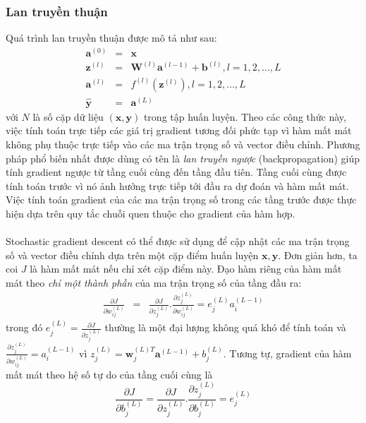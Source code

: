 \documentclass{article}
\begin{document}
\subsubsection*{Lan truyền thuận}
Quá trình lan truyền thuận được mô tả như sau:
\begin{eqnarray}
\label{eq41}
    \textbf{a}^{(0)} &=& \textbf{x}\\
    \label{eq42}
    \textbf{z}^{(l)} &=& \textbf{W}^{(l)}\textbf{a}^{(l-1)}+\textbf{b}^{(l)}, l=1,2,\ldots,L\\
    \label{eq43}
    \textbf{a}^{(l)} &=& f^{(l)}(\textbf{z}^{(l)}), l=1,2,\ldots,L\\
    \label{eq44}
    \hat{\textbf{y}} &=& \textbf{a}^{(L)}
\end{eqnarray}
với $N$ là số cặp dữ liệu $(\mathbf{x}, \mathbf{y})$ trong tập huấn luyện. Theo
các công thức này, việc tính toán trực tiếp các giá trị gradient tương đối phức
tạp vì hàm mất mát không phụ thuộc trực tiếp vào các ma trận trọng số và vector
điều chỉnh. Phương pháp phổ biến nhất được dùng có tên là \textit{lan truyền ngược}
(backpropagation) giúp tính gradient ngược từ tầng cuối cùng đến tầng đầu tiên.
Tầng cuối cùng được tính toán trước vì nó ảnh hưởng trực tiếp tới {đầu ra dự
đoán} và hàm mất mát. Việc tính toán gradient của các ma trận trọng số trong các
tầng trước được thực hiện dựa trên quy tắc chuỗi quen thuộc cho {gradient của hàm
hợp}.\\\\
Stochastic gradient descent có thể được sử dụng để cập nhật các ma trận trọng số và vector điều chỉnh dựa trên một cặp điểm huấn luyện $\mathbf{x, y}$. Đơn giản hơn, ta coi $J$ là hàm mất mát nếu chỉ xét cặp điểm này.
Đạo hàm riêng của hàm mất mát theo \textit{chỉ một thành phần} của ma trận trọng số
của tầng đầu ra:
\begin{eqnarray}
\frac{\partial J}{\partial w_{ij}^{(L)}} &=& \frac{\partial J}{\partial
z_j^{(L)}}. \frac{\partial z_j^{(L)}}{\partial w_{ij}^{(L)}} = e_j^{(L)} a_i^{(L-1)}
\end{eqnarray}
trong đó $\displaystyle e_j^{(L)} = \frac{\partial J}{\partial z_j^{(L)}} $
thường là một đại
lượng {không quá khó để tính toán} và $\displaystyle\frac{\partial
z_j^{(L)}}{\partial w_{ij}^{(L)}}  = a_i^{(L-1)}$ vì $z_j^{(L)} = \mathbf{w}_j^{(L)T}\mathbf{a}^{(L-1)} + b_j^{(L)}$.
Tương tự, gradient của hàm mất mát theo hệ số tự do của tầng cuối cùng là
\begin{equation}
\frac{\partial J}{\partial b_{j}^{(L)}} = \frac{\partial J}{\partial z_j^{(L)}}. \frac{\partial z_j^{(L)}}{\partial b_{j}^{(L)}} = e_j^{(L)}
\end{equation}
\end{document}
